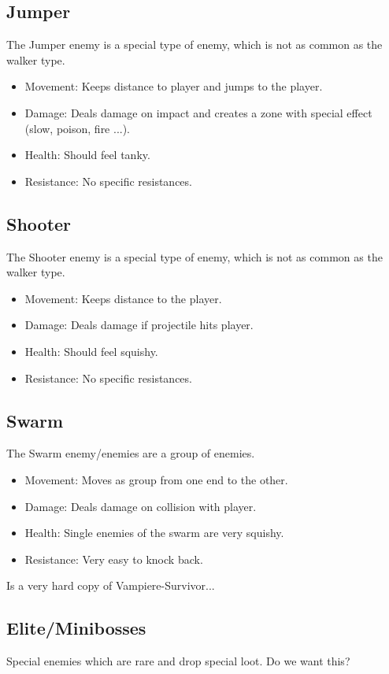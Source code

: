 \documentclass[12pt]{article}
\begin{document}
\subsection{Jumper}
The Jumper enemy is a special type of enemy, which is not as common as the walker type.
\begin{itemize}
    \item Movement: Keeps distance to player and jumps to the player. 
    \item Damage: Deals damage on impact and creates a zone with special effect \\
    (slow, poison, fire ...).
    \item Health: Should feel tanky.
    \item Resistance: No specific resistances.
\end{itemize}

\subsection{Shooter}
The Shooter enemy is a special type of enemy, which is not as common as the walker type.
\begin{itemize}
    \item Movement: Keeps distance to the player.  
    \item Damage: Deals damage if projectile hits player. 
    \item Health: Should feel squishy.
    \item Resistance: No specific resistances.
\end{itemize}

\subsection{Swarm}
The Swarm enemy/enemies are a group of enemies. 
\begin{itemize}
    \item Movement: Moves as group from one end to the other. 
    \item Damage: Deals damage on collision with player.
    \item Health: Single enemies of the swarm are very squishy. 
    \item Resistance: Very easy to knock back. 
\end{itemize}
Is a very hard copy of Vampiere-Survivor... 

\subsection{Elite/Minibosses}
Special enemies which are rare and drop special loot. 
Do we want this? 
\end{document}
